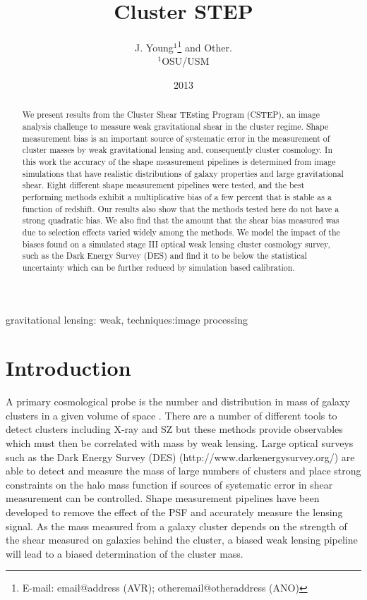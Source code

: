 \documentclass[useAMS,usenatbib]{mn2e}
\title[Cluster Shear TEsting Program]{Cluster STEP}
\author[J. Young et al. ]{J. Young$^{1}$\thanks{E-mail:
email@address (AVR); otheremail@otheraddress (ANO)} and 
Other.\\
$^{1}$OSU/USM \\
}
\begin{document}
\date{2013}

\pagerange{\pageref{firstpage}--\pageref{lastpage}} 

\maketitle

\label{firstpage}

\begin{abstract}
We present results from the Cluster Shear TEsting Program (CSTEP), an image
analysis challenge to measure weak gravitational shear in
the cluster regime. Shape measurement bias is an important source of systematic error in the 
measurement of cluster masses by weak gravitational lensing and,
consequently cluster cosmology. In this work the accuracy of the shape measurement pipelines is determined from image simulations
that have realistic distributions of galaxy properties and large gravitational shear. Eight different shape measurement pipelines were tested, and the best
performing methods exhibit a multiplicative bias of a few percent that
is stable as a function of redshift. Our results also show that the
methods tested here do not have a strong quadratic bias. We also find
that the amount that the shear bias measured was due to selection effects varied widely
among the methods. We model the impact of the
biases found on a simulated stage III optical weak lensing cluster cosmology survey, such as the Dark Energy Survey (DES) and find it to
be below the statistical uncertainty which can be further reduced by simulation based calibration.
\end{abstract}

\begin{keywords}
gravitational lensing: weak, techniques:image processing
\end{keywords}


\section{Introduction}
A primary cosmological probe is the number and distribution in mass of galaxy
clusters in a given volume of space \citep{Allen}. There are a number
of different tools to detect clusters including X-ray and SZ but these
methods provide observables which must then be correlated with mass by
weak lensing. Large optical surveys such as the Dark Energy Survey (DES)
(http://www.darkenergysurvey.org/) are able to detect and measure the
mass of large numbers of clusters and place strong constraints on the
halo mass function if sources of systematic error in shear measurement can be controlled.
Shape measurement pipelines have been developed to remove the 
effect of the PSF and accurately measure the lensing signal. As the
mass measured from a galaxy cluster depends on the strength of the
shear measured on galaxies behind the cluster, a biased weak lensing
pipeline will lead to a biased determination of the cluster mass.
 
\end{document}
